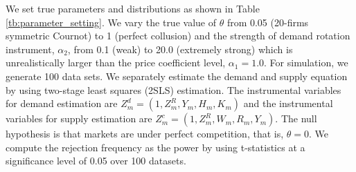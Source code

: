 \documentclass[11pt, a4paper]{article}
\begin{document}
We set true parameters and distributions as shown in Table \ref{tb:parameter_setting}. 
We vary the true value of $\theta$ from 0.05 (20-firms symmetric Cournot) to 1 (perfect collusion) and the strength of demand rotation instrument, $\alpha_2$, from 0.1 (weak) to 20.0 (extremely strong) which is unrealistically larger than the price coefficient level, $\alpha_1=1.0$.
For simulation, we generate 100 data sets.
We separately estimate the demand and supply equation by using two-stage least squares (2SLS) estimation.
The instrumental variables for demand estimation are $Z^{d}_{m} = (1, Z^{R}_{m}, Y_m, H_{m}, K_{m})$ and the instrumental variables for supply estimation are $Z^{c}_{m} = (1, Z^{R}_{m}, W_{m}, R_{m}, Y_m)$. 
The null hypothesis is that markets are under perfect competition, that is, $\theta=0$.
We compute the rejection
frequency as the power by using t-statistics at a significance level of 0.05 over 100 datasets.
\end{document}
